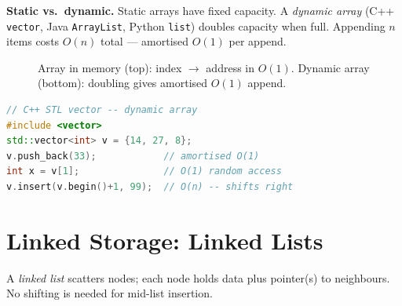 \textbf{Static vs.\ dynamic.} Static arrays have fixed capacity. A \emph{dynamic array} (C++ \texttt{vector}, Java \texttt{ArrayList}, Python \texttt{list}) doubles capacity when full. Appending $n$ items costs $O(n)$ total --- amortised $O(1)$ per append.

\begin{figure}[h]
\centering
{}
\caption{Array in memory (top): index $\to$ address in $O(1)$. Dynamic array (bottom): doubling gives amortised $O(1)$ append.}
\label{fig:array-layout}
\end{figure}

\begin{lstlisting}[language=C++]
// C++ STL vector -- dynamic array
#include <vector>
std::vector<int> v = {14, 27, 8};
v.push_back(33);            // amortised O(1)
int x = v[1];               // O(1) random access
v.insert(v.begin()+1, 99);  // O(n) -- shifts right
\end{lstlisting}

\section{Linked Storage: Linked Lists}
\label{sec:linked-lists}
A \emph{linked list} scatters nodes; each node holds data plus pointer(s) to neighbours. No shifting is needed for mid-list insertion.


